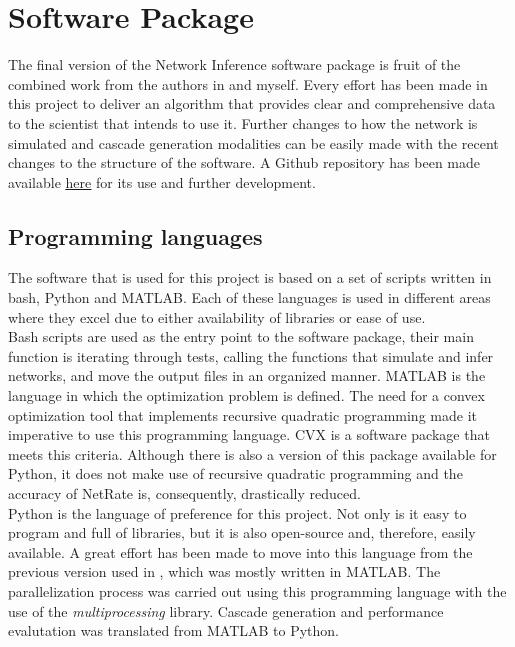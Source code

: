 
\chapter{Software Package}

The final version of the Network Inference software package is fruit of the combined work from the authors in \cite{alexandru2018estimating} and myself. Every effort has been made in this project to deliver an algorithm that provides clear and comprehensive data to the scientist that intends to use it. Further changes to how the network is simulated and cascade generation modalities can be easily made with the recent changes to the structure of the software. A Github repository has been made available \href{https://github.com/gilson15/Network-Inference}{\underline{here}} for its use and further development. 

\section{Programming languages}

The software that is used for this project is based on a set of scripts written in bash, Python and MATLAB. Each of these languages is used in different areas where they excel due to either availability of libraries or ease of use. \\

Bash scripts are used as the entry point to the software package, their main function is iterating through tests, calling the functions that simulate and infer networks, and move the output files in an organized manner.
MATLAB is the language in which the optimization problem is defined. The need for a convex optimization tool that implements recursive quadratic programming made it imperative to use this programming language. CVX is a software package that meets this criteria. Although there is also a version of this package available for Python, it does not make use of recursive quadratic programming and the accuracy of NetRate is, consequently, drastically reduced.\\

Python is the language of preference for this project. Not only is it easy to program and full of libraries, but it is also open-source and, therefore, easily available. A great effort has been made to move into this language from the previous version used in \cite{alexandru2018estimating}, which was mostly written in MATLAB. 
The parallelization process was carried out using this programming language with the use of the \textit{multiprocessing} library. Cascade generation and performance evalutation was translated from MATLAB to Python.\\

